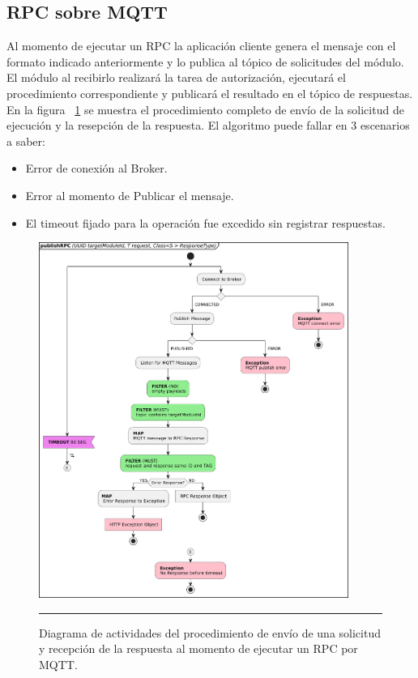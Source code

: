 \subsection{RPC sobre MQTT}
Al momento de ejecutar un RPC la aplicación cliente genera el mensaje con el formato indicado anteriormente y lo publica al tópico de solicitudes del módulo. El módulo al recibirlo realizará la tarea de autorización, ejecutará el procedimiento correspondiente y publicará el resultado en el tópico de respuestas.
En la figura ~\ref{fig:act_publish_rpc} se muestra el procedimiento completo de envío de la solicitud de ejecución y la resepción de la respuesta.
El algoritmo puede fallar en 3 escenarios a saber:
\begin{itemize}
	\item Error de conexión al Broker.
	\item Error al momento de Publicar el mensaje.
	\item El timeout fijado para la operación fue excedido sin registrar respuestas.
\end{itemize}

\begin{figure}[htbp]
	\centering
	\includegraphics[width=0.9\textwidth]{Figures/iter3/ACT_publishRPC_ink.png}
	\rule{35em}{1pt}
	\caption[Actividades RPC MQTT]{Diagrama de actividades del procedimiento de envío de una solicitud y recepción de la respuesta al momento de ejecutar un RPC por MQTT.}
	\label{fig:act_publish_rpc}
\end{figure}

